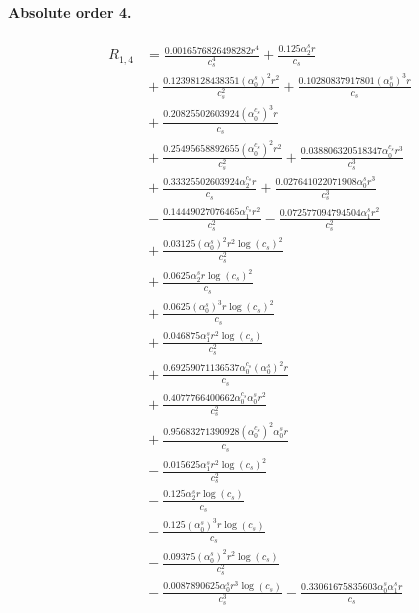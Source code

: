\documentclass[10pt]{article}
\begin{document}
\paragraph{Absolute order 4.}
\begin{align*}
R_{1,4} &= \frac{0.0016576826498282 r^{4}}{c_{s}^{4}} + \frac{0.125 \alpha_{2}^s r}{c_{s}} \\
&{}  + \frac{0.12398128438351 \left(\alpha_{0}^s\right)^{2} r^{2}}{c_{s}^{2}} + \frac{0.10280837917801 \left(\alpha_{0}^s\right)^{3} r}{c_{s}} \\
&{}  + \frac{0.20825502603924 \left(\alpha_{0}^{c_s}\right)^{3} r}{c_{s}} \\
&{}  + \frac{0.25495658892655 \left(\alpha_{0}^{c_s}\right)^{2} r^{2}}{c_{s}^{2}} + \frac{0.038806320518347 \alpha_{0}^{c_s} r^{3}}{c_{s}^{3}} \\
&{}  + \frac{0.33325502603924 \alpha_{2}^{c_s} r}{c_{s}} + \frac{0.027641022071908 \alpha_{0}^s r^{3}}{c_{s}^{3}} \\
&{}  - \frac{0.14449027076465 \alpha_{1}^{c_s} r^{2}}{c_{s}^{2}} - \frac{0.072577094794504 \alpha_{1}^s r^{2}}{c_{s}^{2}} \\
&{}  + \frac{0.03125 \left(\alpha_{0}^s\right)^{2} r^{2} \log{\left(c_{s} \right)}^{2}}{c_{s}^{2}} \\
&{}  + \frac{0.0625 \alpha_{2}^s r \log{\left(c_{s} \right)}^{2}}{c_{s}} \\
&{}  + \frac{0.0625 \left(\alpha_{0}^s\right)^{3} r \log{\left(c_{s} \right)}^{2}}{c_{s}} \\
&{}  + \frac{0.046875 \alpha_{1}^s r^{2} \log{\left(c_{s} \right)}}{c_{s}^{2}} \\
&{}  + \frac{0.69259071136537 \alpha_{0}^{c_s} \left(\alpha_{0}^s\right)^{2} r}{c_{s}} \\
&{}  + \frac{0.4077766400662 \alpha_{0}^{c_s} \alpha_{0}^s r^{2}}{c_{s}^{2}} \\
&{}  + \frac{0.95683271390928 \left(\alpha_{0}^{c_s}\right)^{2} \alpha_{0}^s r}{c_{s}} \\
&{}  - \frac{0.015625 \alpha_{1}^s r^{2} \log{\left(c_{s} \right)}^{2}}{c_{s}^{2}} \\
&{}  - \frac{0.125 \alpha_{2}^s r \log{\left(c_{s} \right)}}{c_{s}} \\
&{}  - \frac{0.125 \left(\alpha_{0}^s\right)^{3} r \log{\left(c_{s} \right)}}{c_{s}} \\
&{}  - \frac{0.09375 \left(\alpha_{0}^s\right)^{2} r^{2} \log{\left(c_{s} \right)}}{c_{s}^{2}} \\
&{}  - \frac{0.0087890625 \alpha_{0}^s r^{3} \log{\left(c_{s} \right)}}{c_{s}^{3}} - \frac{0.33061675835603 \alpha_{0}^s \alpha_{1}^s r}{c_{s}} \\

\end{align*}
\end{document}
